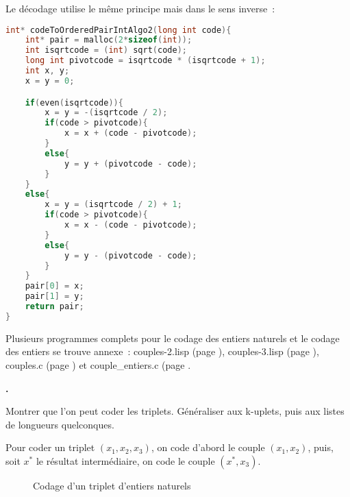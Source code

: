 \documentclass{article}
\newcounter{enoncecount}
\newenvironment{enonce}
{
\stepcounter{enoncecount}
\bf\small \arabic{enoncecount}.
\begin{bf}
}
{
\end{bf}
}
\begin{document}
Le décodage utilise le même principe mais dans le sens inverse~:

\begin{lstlisting}[language=C]
int* codeToOrderedPairIntAlgo2(long int code){
	int* pair = malloc(2*sizeof(int));
	int isqrtcode = (int) sqrt(code);
	long int pivotcode = isqrtcode * (isqrtcode + 1);
	int x, y;
	x = y = 0;	

	if(even(isqrtcode)){
		x = y = -(isqrtcode / 2);
		if(code > pivotcode){
			x = x + (code - pivotcode);
		}
		else{
			y = y + (pivotcode - code);
		}
	}
	else{
		x = y = (isqrtcode / 2) + 1;
		if(code > pivotcode){
			x = x - (code - pivotcode);
		}
		else{
			y = y - (pivotcode - code); 
		}
	}
	pair[0] = x;
	pair[1] = y; 
	return pair;
}
\end{lstlisting}

Plusieurs programmes complets pour le codage des entiers naturels et le codage des entiers se trouve annexe~: couples-2.lisp (page \pageref{couples2lisp}), couples-3.lisp (page \pageref{couples3lisp}), couples.c (page \pageref{couplesc}) et couple\_entiers.c (page \pageref{coupleentiersc}.



\begin{enonce}
Montrer que l'on peut coder les triplets. Généraliser aux k-uplets, puis aux listes de longueurs quelconques.
\end{enonce}

Pour coder un triplet $(x_1, x_2, x_3)$, on code d'abord le couple $(x_1, x_2)$, puis, soit $x^*$ le résultat intermédiaire, on code le couple $(x^*, x_3)$.

\begin{figure}[ht!]
  \centering
  \caption{Codage d'un triplet d'entiers naturels}
  \label{fig:codage-couple}
\end{figure}
\end{document}
